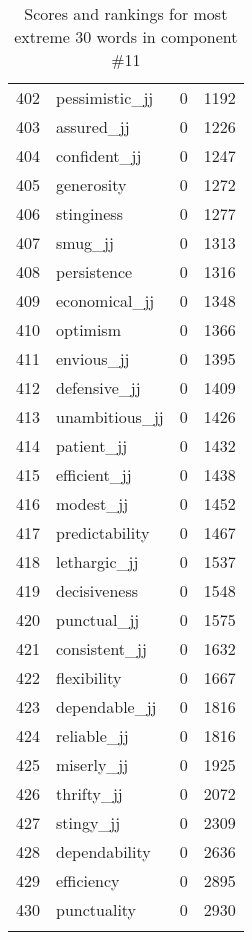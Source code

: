 \begin{longtable}[!htbp]{| rlr@{.}l |}
    402 & pessimistic\_jj & 0 & 1192 \\
    403 & assured\_jj & 0 & 1226 \\
    404 & confident\_jj & 0 & 1247 \\
    405 & generosity & 0 & 1272 \\
    406 & stinginess & 0 & 1277 \\
    407 & smug\_jj & 0 & 1313 \\
    408 & persistence & 0 & 1316 \\
    409 & economical\_jj & 0 & 1348 \\
    410 & optimism & 0 & 1366 \\
    411 & envious\_jj & 0 & 1395 \\
    412 & defensive\_jj & 0 & 1409 \\
    413 & unambitious\_jj & 0 & 1426 \\
    414 & patient\_jj & 0 & 1432 \\
    415 & efficient\_jj & 0 & 1438 \\
    416 & modest\_jj & 0 & 1452 \\
    417 & predictability & 0 & 1467 \\
    418 & lethargic\_jj & 0 & 1537 \\
    419 & decisiveness & 0 & 1548 \\
    420 & punctual\_jj & 0 & 1575 \\
    421 & consistent\_jj & 0 & 1632 \\
    422 & flexibility & 0 & 1667 \\
    423 & dependable\_jj & 0 & 1816 \\
    424 & reliable\_jj & 0 & 1816 \\
    425 & miserly\_jj & 0 & 1925 \\
    426 & thrifty\_jj & 0 & 2072 \\
    427 & stingy\_jj & 0 & 2309 \\
    428 & dependability & 0 & 2636 \\
    429 & efficiency & 0 & 2895 \\
    430 & punctuality & 0 & 2930 \\
    \hline
    \caption{Scores and rankings for most extreme 30 words in component \#11} \\
\end{longtable}
